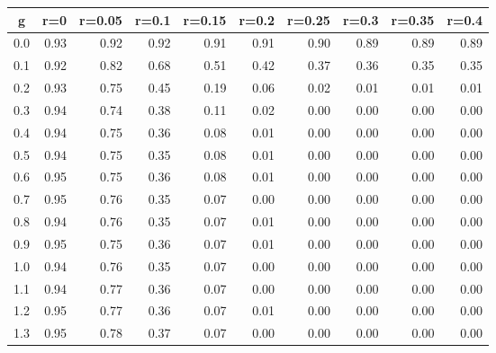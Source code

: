 %
\begin{table}[!tbp]
 \begin{center}
 \begin{tabular}{rrrrrrrrrr}\hline\hline
\multicolumn{1}{c}{g}&\multicolumn{1}{c}{r=0}&\multicolumn{1}{c}{r=0.05}&\multicolumn{1}{c}{r=0.1}&\multicolumn{1}{c}{r=0.15}&\multicolumn{1}{c}{r=0.2}&\multicolumn{1}{c}{r=0.25}&\multicolumn{1}{c}{r=0.3}&\multicolumn{1}{c}{r=0.35}&\multicolumn{1}{c}{r=0.4}\tabularnewline
\hline
0.0&0.93&0.92&0.92&0.91&0.91&0.90&0.89&0.89&0.89\tabularnewline
0.1&0.92&0.82&0.68&0.51&0.42&0.37&0.36&0.35&0.35\tabularnewline
0.2&0.93&0.75&0.45&0.19&0.06&0.02&0.01&0.01&0.01\tabularnewline
0.3&0.94&0.74&0.38&0.11&0.02&0.00&0.00&0.00&0.00\tabularnewline
0.4&0.94&0.75&0.36&0.08&0.01&0.00&0.00&0.00&0.00\tabularnewline
0.5&0.94&0.75&0.35&0.08&0.01&0.00&0.00&0.00&0.00\tabularnewline
0.6&0.95&0.75&0.36&0.08&0.01&0.00&0.00&0.00&0.00\tabularnewline
0.7&0.95&0.76&0.35&0.07&0.00&0.00&0.00&0.00&0.00\tabularnewline
0.8&0.94&0.76&0.35&0.07&0.01&0.00&0.00&0.00&0.00\tabularnewline
0.9&0.95&0.75&0.36&0.07&0.01&0.00&0.00&0.00&0.00\tabularnewline
1.0&0.94&0.76&0.35&0.07&0.00&0.00&0.00&0.00&0.00\tabularnewline
1.1&0.94&0.77&0.36&0.07&0.00&0.00&0.00&0.00&0.00\tabularnewline
1.2&0.95&0.77&0.36&0.07&0.01&0.00&0.00&0.00&0.00\tabularnewline
1.3&0.95&0.78&0.37&0.07&0.00&0.00&0.00&0.00&0.00\tabularnewline
\hline
\end{tabular}

\end{center}

\end{table}

